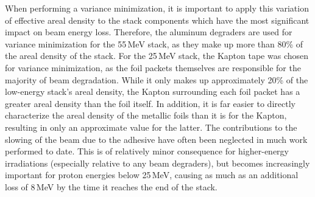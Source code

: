 When performing  a variance minimization, it is important to apply this variation of effective areal density  to the stack components which  have the most significant impact on beam energy loss.
Therefore, the aluminum degraders are used for variance minimization for the 55\,MeV stack, as they make up more than 80\% of the areal density of the stack.
For the 25\,MeV stack, the Kapton tape was chosen for variance minimization, as the foil packets themselves are responsible for the majority of beam degradation.
While it only makes up approximately 20\% of the low-energy stack's areal density, the Kapton surrounding each foil packet has a greater areal density than the foil itself.
In addition, it is far easier to directly characterize the areal density of the metallic foils than it is for the Kapton, resulting in only an approximate value for the latter.
The contributions to the slowing of the beam due to the adhesive have often been neglected in much work performed to date. 
This is of relatively minor consequence for higher-energy irradiations (especially relative to any beam degraders), but 
becomes increasingly important for proton energies below 
25\,MeV, causing as much as an additional loss of 8\,MeV  by the time it reaches the end of the stack.





